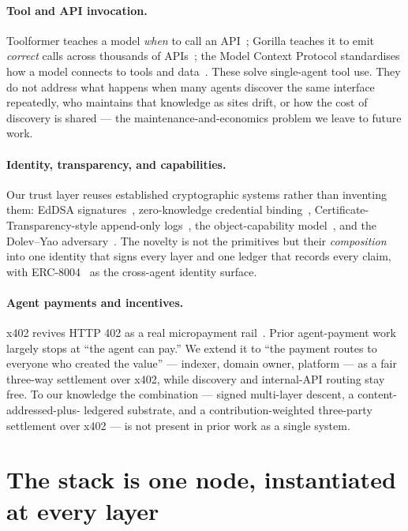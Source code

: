 \documentclass[11pt]{article}
\begin{document}
\paragraph{Tool and API invocation.} Toolformer teaches a model \emph{when} to call
an API~\cite{toolformer}; Gorilla teaches it to emit \emph{correct} calls across
thousands of APIs~\cite{gorilla}; the Model Context Protocol standardises how a model
connects to tools and data~\cite{mcp}. These solve single-agent tool use. They do not
address what happens when many agents discover the same interface repeatedly, who
maintains that knowledge as sites drift, or how the cost of discovery is shared --- the
maintenance-and-economics problem we leave to future work.

\paragraph{Identity, transparency, and capabilities.} Our trust layer reuses
established cryptographic systems rather than inventing them: EdDSA
signatures~\cite{rfc8032}, zero-knowledge credential binding~\cite{zklogin,camlys},
Certificate-Transparency-style append-only logs~\cite{rfc6962}, the object-capability
model~\cite{ocap}, and the Dolev--Yao adversary~\cite{dolevyao}. The novelty is not the
primitives but their \emph{composition} into one identity that signs every layer and
one ledger that records every claim, with ERC-8004~\cite{erc8004} as the cross-agent
identity surface.

\paragraph{Agent payments and incentives.} x402 revives HTTP 402 as a real
micropayment rail~\cite{x402}. Prior agent-payment work largely stops at ``the agent
can pay.'' We extend it to ``the payment routes to everyone who created the value'' ---
indexer, domain owner, platform --- as a fair three-way settlement over x402, while
discovery and internal-API routing stay free. To our
knowledge the combination --- signed multi-layer descent, a content-addressed-plus-
ledgered substrate, and a contribution-weighted three-party settlement over x402 --- is
not present in prior work as a single system.

\section{The stack is one node, instantiated at every layer}
\end{document}
